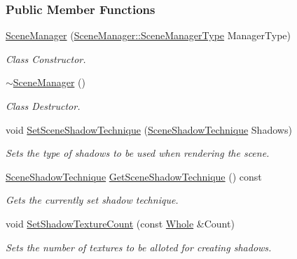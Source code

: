 \subsubsection*{Public Member Functions}
\begin{DoxyCompactItemize}
\item 
\hyperlink{classphys_1_1SceneManager_a6a6a5b747704d3f4bb724f1b893e2695}{SceneManager} (\hyperlink{classphys_1_1SceneManager_a14fe15dcf41564fdf12f3e11c1a4b774}{SceneManager::SceneManagerType} ManagerType)
\begin{DoxyCompactList}\small\item\em Class Constructor. \item\end{DoxyCompactList}\item 
\hyperlink{classphys_1_1SceneManager_a5076643eec92dc0c9c9ccb7ac2225cde}{$\sim$SceneManager} ()
\begin{DoxyCompactList}\small\item\em Class Destructor. \item\end{DoxyCompactList}\item 
void \hyperlink{classphys_1_1SceneManager_a620405e97c1ff656dc09524e4c1d1b4b}{SetSceneShadowTechnique} (\hyperlink{classphys_1_1SceneManager_a427f1bbb52c11ad07352ae01d8b3c746}{SceneShadowTechnique} Shadows)
\begin{DoxyCompactList}\small\item\em Sets the type of shadows to be used when rendering the scene. \item\end{DoxyCompactList}\item 
\hyperlink{classphys_1_1SceneManager_a427f1bbb52c11ad07352ae01d8b3c746}{SceneShadowTechnique} \hyperlink{classphys_1_1SceneManager_a29cb7b20fb3b64b95bd951d65ffe8bca}{GetSceneShadowTechnique} () const 
\begin{DoxyCompactList}\small\item\em Gets the currently set shadow technique. \item\end{DoxyCompactList}\item 
void \hyperlink{classphys_1_1SceneManager_a6e09079b87f29fd3c7b7716f88d5081f}{SetShadowTextureCount} (const \hyperlink{namespacephys_a460f6bc24c8dd347b05e0366ae34f34a}{Whole} \&Count)
\begin{DoxyCompactList}\small\item\em Sets the number of textures to be alloted for creating shadows. \item\end{DoxyCompactList}\item 

\end{DoxyCompactItemize}
